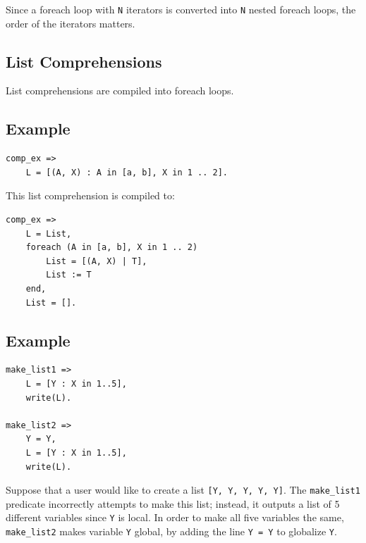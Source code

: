 Since a foreach loop with \texttt{N} iterators is converted into \texttt{N} nested foreach loops, the order of the iterators matters.  

\subsection{List Comprehensions}
List comprehensions are compiled into foreach loops.

\subsection*{Example}
\begin{verbatim}
comp_ex =>
    L = [(A, X) : A in [a, b], X in 1 .. 2].
\end{verbatim}
This list comprehension is compiled to:
\begin{verbatim}
comp_ex =>
    L = List, 
    foreach (A in [a, b], X in 1 .. 2)
        List = [(A, X) | T], 
        List := T
    end,
    List = [].
\end{verbatim}

\subsection*{Example}
\begin{verbatim}
make_list1 =>
    L = [Y : X in 1..5],
    write(L).

make_list2 =>
    Y = Y,
    L = [Y : X in 1..5],
    write(L).
\end{verbatim}
Suppose that a user would like to create a list \texttt{[Y, Y, Y, Y, Y]}.  The \texttt{make\_list1} predicate incorrectly attempts to make this list; instead, it outputs a list of 5 different variables since \texttt{Y} is local.  In order to make all five variables the same, \texttt{make\_list2} makes variable \texttt{Y} global, by adding the line \texttt{Y = Y} to globalize \texttt{Y}.

\ignore{

}
